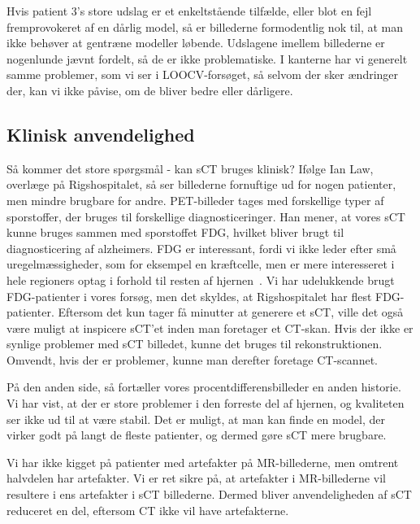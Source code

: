 Hvis patient 3’s store udslag er et enkeltstående tilfælde, eller
blot en fejl fremprovokeret af en dårlig model, så er billederne
formodentlig nok til, at man ikke behøver at gentræne modeller
løbende. Udslagene imellem billederne er nogenlunde jævnt fordelt, så
de er ikke problematiske. I kanterne har vi generelt samme problemer,
som vi ser i LOOCV-forsøget, så selvom der sker ændringer der, kan vi
ikke påvise, om de bliver bedre eller dårligere.

\subsection{Klinisk anvendelighed}

Så kommer det store spørgsmål - kan sCT bruges klinisk? Ifølge
Ian Law, overlæge på Rigshospitalet, så ser billederne fornuftige
ud for nogen patienter, men mindre brugbare for andre. PET-billeder
tages med forskellige typer af sporstoffer, der bruges til forskellige
diagnosticeringer. Han mener, at vores sCT kunne bruges sammen med
sporstoffet FDG, hvilket bliver brugt til diagnosticering af alzheimers.
FDG er interessant, fordi vi ikke leder efter små uregelmæssigheder,
som for eksempel en kræftcelle, men er mere interesseret i hele
regioners optag i forhold til resten af hjernen~\cite{alzheimer}. Vi
har udelukkende brugt FDG-patienter i vores forsøg, men det skyldes,
at Rigshospitalet har flest FDG-patienter. Eftersom det kun tager få
minutter at generere et sCT, ville det også være muligt at inspicere
sCT’et inden man foretager et CT-skan. Hvis der ikke er synlige
problemer med sCT billedet, kunne det bruges til rekonstruktionen.
Omvendt, hvis der er problemer, kunne man derefter foretage CT-scannet.

På den anden side, så fortæller vores procentdifferensbilleder en anden historie. Vi har vist, at der er store problemer i den forreste del af hjernen, og kvaliteten ser ikke ud til at være stabil. Det er muligt, at man kan finde en model, der virker godt på langt de fleste patienter, og dermed gøre sCT mere brugbare.

Vi har ikke kigget på patienter med artefakter på MR-billederne, men omtrent halvdelen har artefakter. Vi er ret sikre på, at artefakter i MR-billederne vil resultere i ens artefakter i sCT billederne. Dermed bliver anvendeligheden af sCT reduceret en del, eftersom CT ikke vil have artefakterne.
